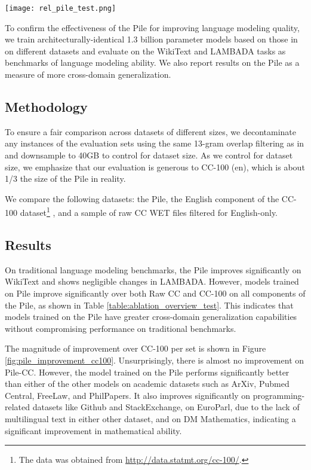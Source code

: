 \documentclass[11pt,a4paper]{article}
\begin{document}
\begin{figure*}[ht]
  \texttt{[image: rel\_pile\_test.png]}
  \caption{Magnitude of \textsc{bpb} improvement of Pile model over CC-100 model on each test set.}
  \label{fig:pile_improvement_cc100}
\end{figure*}

To confirm the effectiveness of the Pile for improving language modeling quality, we train architecturally-identical 1.3 billion parameter models based on those in \citet{GPT3} on different datasets and evaluate on the WikiText and LAMBADA tasks as benchmarks of language modeling ability. We also report results on the Pile as a measure of more cross-domain generalization.

\subsection{Methodology}

To ensure a fair comparison across datasets of different sizes, we decontaminate any instances of the evaluation sets using the same 13-gram overlap filtering as in \citet{GPT3} and downsample to 40GB to control for dataset size. As we control for dataset size, we emphasize that our evaluation is generous to CC-100 (en), which is about 1/3 the size of the Pile in reality.  

We compare the following datasets: the Pile, the English component of the CC-100 dataset\footnote{The data was obtained from \url{http://data.statmt.org/cc-100/}.} \citep{wenzek2019ccnet,conneau2019xlmr}, and a sample of raw CC WET files filtered for English-only. 

\subsection{Results}

On traditional language modeling benchmarks, the Pile improves significantly on WikiText and shows negligible changes in LAMBADA. However, models trained on Pile improve significantly over both Raw CC and CC-100 on all components of the Pile, as shown in Table \ref{table:ablation_overview_test}. This indicates that models trained on the Pile have greater cross-domain generalization capabilities without compromising performance on traditional benchmarks.

The magnitude of improvement over CC-100 per set is shown in Figure \ref{fig:pile_improvement_cc100}. Unsurprisingly, there is almost no improvement on Pile-CC. However, the model trained on the Pile performs significantly better than either of the other models on academic datasets such as ArXiv, Pubmed Central, FreeLaw, and PhilPapers. It also improves significantly on programming-related datasets like Github and StackExchange, on EuroParl, due to the lack of multilingual text in either other dataset, and on DM Mathematics, indicating a significant improvement in mathematical ability.
\end{document}
